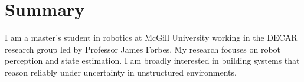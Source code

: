 \section{Summary}
I am a master's student in robotics at McGill University working in the DECAR research group led by Professor James Forbes. My research focuses on robot perception and state estimation. I am broadly interested in building systems that reason reliably under uncertainty in unstructured environments.
